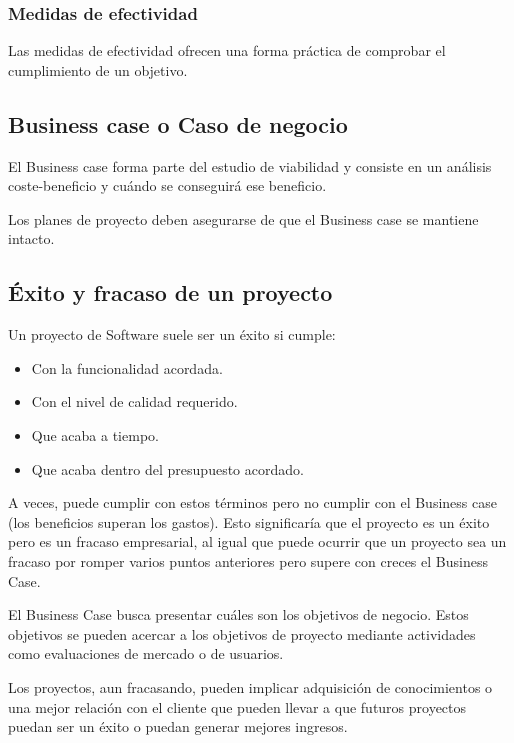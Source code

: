 \documentclass[12pt]{article}
\begin{document}
\subsubsection{Medidas de efectividad}
\label{1.10.2}

{Las medidas de efectividad ofrecen una forma práctica de comprobar el cumplimiento de un objetivo.}

\subsection{Business case o Caso de negocio}
\label{1.11.0}

{El Business case forma parte del estudio de viabilidad y consiste en un análisis coste-beneficio y cuándo se conseguirá ese beneficio.} \bigskip

{Los planes de proyecto deben asegurarse de que el Business case se mantiene intacto.}

\subsection{Éxito y fracaso de un proyecto}
\label{1.12.0}

{Un proyecto de Software suele ser un éxito si cumple:}

\begin{itemize}
    \item {Con la funcionalidad acordada.}
    \item {Con el nivel de calidad requerido.}
    \item {Que acaba a tiempo.}
    \item {Que acaba dentro del presupuesto acordado.}
\end{itemize}

{A veces, puede cumplir con estos términos pero no cumplir con el Business case (los beneficios superan los gastos). Esto significaría que el proyecto es un éxito pero es un fracaso empresarial, al igual que puede ocurrir que un proyecto sea un fracaso por romper varios puntos anteriores pero supere con creces el Business Case.} \bigskip

{El Business Case busca presentar cuáles son los objetivos de negocio. Estos objetivos se pueden acercar a los objetivos de proyecto mediante actividades como evaluaciones de mercado o de usuarios.} \bigskip

{Los proyectos, aun fracasando, pueden implicar adquisición de conocimientos o una mejor relación con el cliente que pueden llevar a que futuros proyectos puedan ser un éxito o puedan generar mejores ingresos.}
\end{document}
